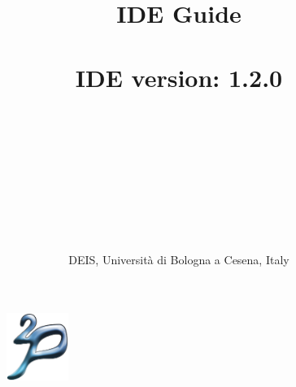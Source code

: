 \documentclass[11pt]{report}
\title{{\huge{\bf{\tuprolog{} IDE Guide\\\mbox{ }\\}}}
        \tuprolog{} IDE version: 1.2.0\\\mbox{ }\\
{\small{
\version{003}\\
\creationdate{2002-09-17}\\
\lastchangesdate{2004-09-27}\\
}}
}
\author{ \mbox{ }\\DEIS, Universit\`{a} di Bologna a Cesena, Italy}
\date{}
\newcommand\logo{
    \begin{figure}[tp]
        \begin{center}
            \includegraphics[width=2cm]{images/logo}
        \end{center}
\end{figure}
}
\begin{document}
\logo

\maketitle

\tableofcontents


\end{document}
